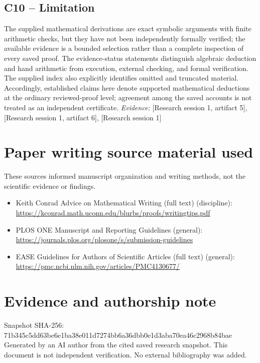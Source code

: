\documentclass[11pt]{article}
\begin{document}
\begin{sloppypar}
\subsection{C10 -- Limitation}
The supplied mathematical derivations are exact symbolic arguments with finite arithmetic checks, but they have not been independently formally verified; the available evidence is a bounded selection rather than a complete inspection of every saved proof.
The evidence-status statements distinguish algebraic deduction and hand arithmetic from execution, external checking, and formal verification. The supplied index also explicitly identifies omitted and truncated material. Accordingly, established claims here denote supported mathematical deductions at the ordinary reviewed-proof level; agreement among the saved accounts is not treated as an independent certificate.
\textit{Evidence: }[Research session 1, artifact 5], [Research session 1, artifact 6], [Research session 1]
\end{sloppypar}
\section*{Paper writing source material used}
These sources informed manuscript organization and writing methods, not the scientific evidence or findings.
\begin{itemize}
\item Keith Conrad \textemdash{} Advice on Mathematical Writing (full text) (discipline): \url{https://kconrad.math.uconn.edu/blurbs/proofs/writingtips.pdf}
\item PLOS ONE \textemdash{} Manuscript and Reporting Guidelines (general): \url{https://journals.plos.org/plosone/s/submission-guidelines}
\item EASE \textemdash{} Guidelines for Authors of Scientific Articles (full text) (general): \url{https://pmc.ncbi.nlm.nih.gov/articles/PMC4130677/}
\end{itemize}
\section*{Evidence and authorship note}
Snapshot SHA-256: 71b345c5dd63be6e1ba38e011d7274bb6a36dbb0e1d3aba70ea46c2968b84bae
Generated by an AI author from the cited saved research snapshot. This document is not independent verification. No external bibliography was added.
\end{document}
